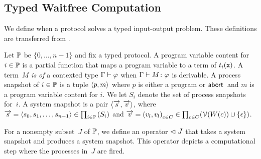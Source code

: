 {\subsection{Typed Waitfree Computation}

We define when a protocol solves a typed
input-output problem.
These definitions are transferred from \citet{Saks:1993vq}.

Let $\mathbb{P}$ be $\{0,\ldots, n-1\}$ and fix
a typed protocol.
A program variable content for $i\in\mathbb{P}$ is a
partial
function
that maps a program variable to a term of $t_i(\texttt{x})$.
A term~$M$ \textit{is of} a contexted type $\Gamma\vdash\varphi$ when
$\Gamma\vdash
{M} \colon{\varphi}$ is derivable.
A process snapshot of $i\in\mathbb{P}$ is a tuple
$\langle{p,m}\rangle$ where $p$ is either a program or $\mathsf{abort\,}$ and $m$ is a
program variable content for $i$.
We let $S_i$ denote the set of process snapshots for~$i$.
A system snapshot
is a pair $\langle{\overrightarrow s, \overrightarrow v}\rangle$, where $\overrightarrow s = \langle{s_0,
{s_1,{\ldots,s_{n-1}}}}\rangle \in
\prod_{i\in \mathbb{P}}\left(S_i\right)
$
and
$\overrightarrow v =
\left({v}_{l}, {v}_{l}\right)_{c\in C} \in \prod_{c\in C}(\mathcal{V}(W(c))\cup\{\epsilon\})
$.

For a nonempty subset~$J$ of $\mathbb{P}$, we define an operator $\vartriangleleft J$ that
takes a system snapshot and produces a system snapshot.
This operator depicts a computational step where the processes in~$J$
are fired.

}
